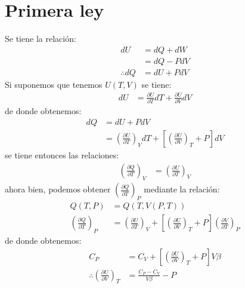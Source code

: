 \documentclass{article}
\author{Ricky Frank}
\begin{document}
\section*{Primera ley}
Se tiene la relación:
\begin{align*}
    dU 
    &=dQ + dW \\
    &=dQ - PdV \\
    \therefore dQ 
    &=dU + PdV 
\end{align*}
Si suponemos que tenemos $U(T,V)$ se tiene:
\begin{align*}
    dU &=\frac{\partial U}{\partial T} dT + \frac{\partial U}{\partial V}dV 
\end{align*}
de donde obtenemos:
\begin{align*}
    dQ 
    &=dU + PdV \\
    &=\left(\frac{\partial U}{\partial T}\right)_V dT 
    + \left[\left(\frac{\partial U}{\partial V}\right)_T + P \right] dV
\end{align*}
se tiene entonces las relaciones:
\begin{align*}
    \left(\frac{\partial Q}{\partial T}\right)_V 
    &=\left(\frac{\partial U}{\partial T}\right)_V
\end{align*}
ahora bien, podemos obtener $\left(\frac{\partial Q}{\partial T}\right)_P$ mediante
la relación:
\begin{align*}
    Q(T,P) 
    &=Q(T,V(P,T)) \\
    \left(\frac{\partial Q}{\partial T}\right)_P
    &=\left(\frac{\partial U}{\partial T}\right)_V
    + \left[\left(\frac{\partial U}{\partial V}\right)_T + P \right] 
    \left( \frac{\partial V}{\partial T} \right)_P
\end{align*}
de donde obtenemos:
\begin{align*}
    C_P 
    &=C_V + \left[ \left( \frac{\partial U}{\partial V} \right)_T + P \right] V\beta \\
    \therefore \left( \frac{\partial U}{\partial V} \right)_T 
    &= \frac{C_P - C_V}{V \beta} - P
\end{align*}
\end{document}
